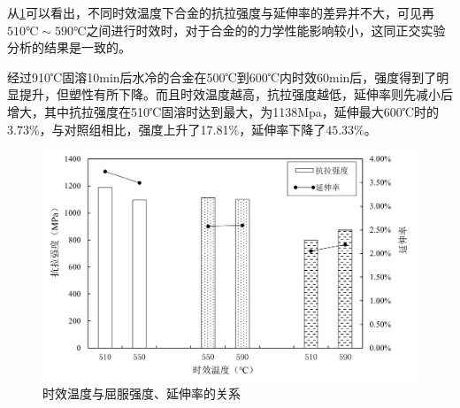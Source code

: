 从\ref{fig:sqy}可以看出，不同时效温度下合金的抗拉强度与延伸率的差异并不大，可见再$510℃\sim 590℃$之间进行时效时，对于合金的的力学性能影响较小，这同正交实验分析的结果是一致的。

经过910℃固溶10min后水冷的合金在500℃到600℃内时效60min后，强度得到了明显提升，但塑性有所下降。而且时效温度越高，抗拉强度越低，延伸率则先减小后增大，其中抗拉强度在510℃固溶时达到最大，为1138Mpa，延伸最大600℃时的$ 3.73\% $，与对照组相比，强度上升了17.81$ \% $，延伸率下降了$ 45.33\% $。
\begin{figure}[h!]
	\centering
	\includegraphics[width=0.7\linewidth]{pic/时效温度与屈服强度、延伸率的关系}
	\caption{时效温度与屈服强度、延伸率的关系}
	\label{fig:sqy}
\end{figure}


